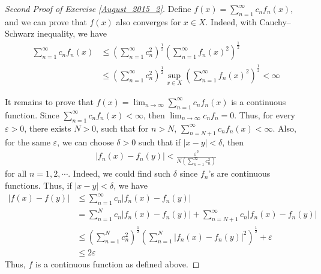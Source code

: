 \documentclass[11pt]{article}
\theoremstyle{definition}
\numberwithin{equation}{subsection}
\begin{document}
\begin{proof}[Second Proof of Exercise \ref{August_2015_2}]
Define $f(x) = \sum_{n=1}^\infty c_n f_n(x)$, and we can prove that $f(x)$ also converges for $x\in X$. Indeed, with Cauchy–Schwarz inequality, we have
\begin{align*}
    \sum_{n=1}^\infty c_nf_n(x) & \leq \left(\sum_{n=1}^\infty c_n^2\right)^{\frac{1}{2}} \left(\sum_{n=1}^\infty f_n(x)^2\right)^{\frac{1}{2}} \\
    & \leq \left(\sum_{n=1}^\infty c_n^2\right)^{\frac{1}{2}} \sup_{x\in X} \left(\sum_{n=1}^\infty f_n(x)^2\right)^{\frac{1}{2}} < \infty
\end{align*}

It remains to prove that $f(x) = \lim_{n\to\infty}\sum_{n=1}^\infty c_n f_n(x)$ is a continuous function. Since $\sum_{n=1}^\infty c_nf_n(x) < \infty$, then $\lim_{n\to\infty} c_n f_n = 0$. Thus, for every $\varepsilon > 0$, there exists $N > 0$, such that for $n > N$, $\sum_{n=N+1}^\infty c_nf_n(x) < \infty$. Also, for the same $\varepsilon$, we can choose $\delta > 0$ such that if $|x - y| < \delta$, then 
\begin{align*}
    \left|f_n(x) - f_n(y)\right| < \frac{\varepsilon^2}{N \left(\sum_{n=1}^\infty c_n^2\right)}
\end{align*}
for all $n = 1,2,\cdots$. Indeed, we could find such $\delta$ since $f_n$'s are continuous functions. Thus, if $|x - y| < \delta$, we have 
\begin{align*}
    \left|f(x) - f(y)\right| & \leq \sum_{n=1}^\infty c_n \left|f_n(x) - f_n(y)\right|\\
    & = \sum_{n=1}^N c_n \left|f_n(x) - f_n(y)\right| + \sum_{n=N+1}^\infty c_n \left|f_n(x) - f_n(y)\right|\\
    & \leq \left(\sum_{n=1}^N c_n^2\right)^{\frac{1}{2}} \left(\sum_{n=1}^N \left|f_n(x) - f_n(y)\right|^2\right)^{\frac{1}{2}} + \varepsilon \\
    & \leq 2 \varepsilon 
\end{align*}
Thus, $f$ is a continuous function as defined above.
\end{proof}
\end{document}
